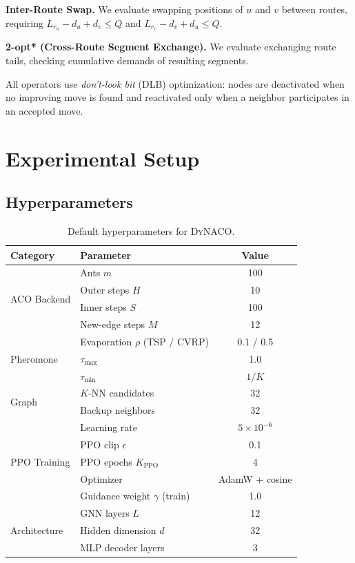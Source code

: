 \documentclass[sigconf,review]{acmart}
\newcommand{\DyNACO}{\textsc{DyNACO}}
\begin{document}
\textbf{Inter-Route Swap.}
We evaluate swapping positions of $u$ and $v$ between routes, requiring $L_{r_u} - d_u + d_v \leq Q$ and $L_{r_v} - d_v + d_u \leq Q$.

\textbf{2-opt* (Cross-Route Segment Exchange).}
We evaluate exchanging route tails, checking cumulative demands of resulting segments.

All operators use \emph{don't-look bit} (DLB) optimization: nodes are deactivated when no improving move is found and reactivated only when a neighbor participates in an accepted move.

\section{Experimental Setup}
\label{app:setup}

\subsection{Hyperparameters}
\label{app:repro}

\begin{table}[h]
\centering
\caption{Default hyperparameters for \DyNACO{}.}
\label{tab:hyperparams}
\small
\begin{tabular}{llc}
\toprule
Category & Parameter & Value \\
\midrule
\multirow{4}{*}{ACO Backend}
    & Ants $m$ & 100 \\
    & Outer steps $H$ & 10 \\
    & Inner steps $S$ & 100 \\
    & New-edge steps $M$ & 12 \\
\midrule
\multirow{3}{*}{Pheromone}
    & Evaporation $\rho$ (TSP / CVRP) & 0.1 / 0.5 \\
    & $\tau_{\max}$ & 1.0 \\
    & $\tau_{\min}$ & $1/K$ \\
\midrule
\multirow{2}{*}{Graph}
    & $K$-NN candidates & 32 \\
    & Backup neighbors & 32 \\
\midrule
\multirow{5}{*}{PPO Training}
    & Learning rate & $5 \times 10^{-6}$ \\
    & PPO clip $\epsilon$ & 0.1 \\
    & PPO epochs $K_{\text{PPO}}$ & 4 \\
    & Optimizer & AdamW + cosine \\
    & Guidance weight $\gamma$ (train) & 1.0 \\
\midrule
\multirow{3}{*}{Architecture}
    & GNN layers $L$ & 12 \\
    & Hidden dimension $d$ & 32 \\
    & MLP decoder layers & 3 \\
\bottomrule
\end{tabular}
\end{table}
\end{document}
